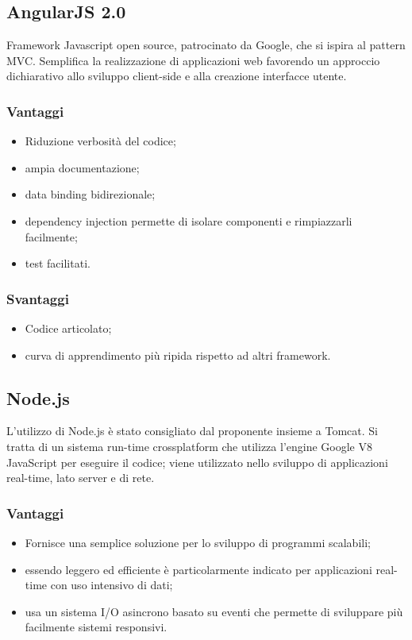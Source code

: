 \documentclass[a4paper, titlepage]{article}
\begin{document}
\subsection{AngularJS 2.0}
Framework Javascript open source, patrocinato da Google, che si ispira al pattern MVC.
Semplifica la realizzazione di applicazioni web favorendo un approccio dichiarativo allo sviluppo client-side e alla creazione interfacce utente.

\subsubsection{Vantaggi}

\begin{itemize}
	\item Riduzione verbosità del codice;
	\item ampia documentazione;
	\item data binding bidirezionale;
	\item dependency injection permette di isolare componenti e rimpiazzarli facilmente;
	\item test facilitati.
\end{itemize}

\subsubsection{Svantaggi}

\begin{itemize}
	\item Codice articolato;
	\item curva di apprendimento più ripida rispetto ad altri framework.
\end{itemize}

\subsection{Node.js}
L'utilizzo di Node.js è stato consigliato dal proponente insieme a Tomcat. Si tratta di un sistema run-time crossplatform che utilizza l’engine Google V8 JavaScript per eseguire il codice; viene utilizzato nello sviluppo di applicazioni real-time, lato server e di rete.

\subsubsection{Vantaggi}

\begin{itemize}
	\item Fornisce una semplice soluzione per lo sviluppo di programmi scalabili;
	\item essendo leggero ed efficiente è particolarmente indicato per applicazioni real-time con uso intensivo di dati;
	\item usa un sistema I/O asincrono basato su eventi che permette di sviluppare più facilmente sistemi responsivi.
\end{itemize}
\end{document}
